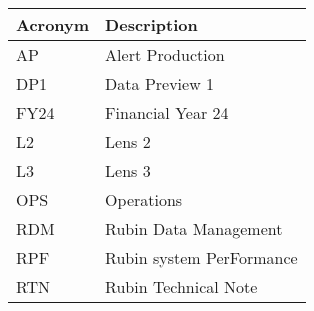 \addtocounter{table}{-1}
\begin{longtable}{p{}p{}}\hline
\textbf{Acronym} & \textbf{Description}  \\\hline

AP & Alert Production \\\hline
DP1 & Data Preview 1 \\\hline
FY24 & Financial Year 24 \\\hline
L2 & Lens 2 \\\hline
L3 & Lens 3 \\\hline
OPS & Operations \\\hline
RDM & Rubin Data Management \\\hline
RPF & Rubin system PerFormance \\\hline
RTN & Rubin Technical Note \\\hline
\end{longtable}
